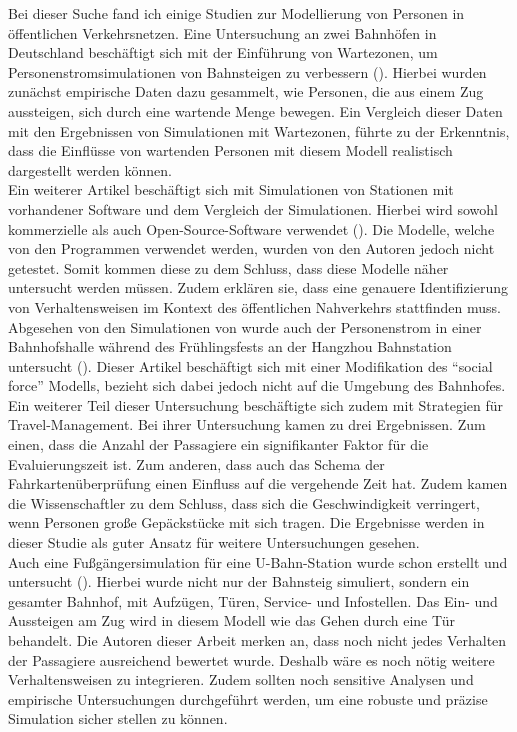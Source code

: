 Bei dieser Suche fand ich einige Studien zur Modellierung von Personen in öffentlichen Verkehrsnetzen.
Eine Untersuchung an zwei Bahnhöfen in Deutschland beschäftigt sich mit der Einführung von Wartezonen, um Personenstromsimulationen von Bahnsteigen zu verbessern (\cite{Davidich.2013}). Hierbei wurden zunächst empirische Daten dazu gesammelt, wie Personen, die aus einem Zug aussteigen, sich durch eine wartende Menge bewegen. Ein Vergleich dieser Daten mit den Ergebnissen von Simulationen mit Wartezonen, führte zu der Erkenntnis, dass die Einflüsse von wartenden Personen mit diesem Modell realistisch dargestellt werden können. \\
Ein weiterer Artikel beschäftigt sich mit Simulationen von Stationen mit vorhandener Software und dem Vergleich der Simulationen. Hierbei wird sowohl kommerzielle als auch Open-Source-Software verwendet (\cite{DubrocaVoisin.2019}). Die Modelle, welche von den Programmen verwendet werden, wurden von den Autoren jedoch nicht getestet. Somit kommen diese zu dem Schluss, dass diese Modelle näher untersucht werden müssen. Zudem erklären sie, dass eine genauere Identifizierung von Verhaltensweisen im Kontext des öffentlichen Nahverkehrs stattfinden muss.\\
Abgesehen von den Simulationen von \cite{DubrocaVoisin.2019} wurde auch der Personenstrom in einer Bahnhofshalle während des Frühlingsfests an der Hangzhou Bahnstation untersucht (\cite{Wang.2013}). Dieser Artikel beschäftigt sich mit einer Modifikation des "`social force"' Modells, bezieht sich dabei jedoch nicht auf die Umgebung des Bahnhofes. Ein weiterer Teil dieser Untersuchung beschäftigte sich zudem mit Strategien für Travel-Management. Bei ihrer Untersuchung kamen \cite{Wang.2013} zu drei Ergebnissen. Zum einen, dass die Anzahl der Passagiere ein signifikanter Faktor für die Evaluierungszeit ist. Zum anderen, dass auch das Schema der Fahrkartenüberprüfung einen Einfluss auf die vergehende Zeit hat. Zudem kamen die Wissenschaftler zu dem Schluss, dass sich die Geschwindigkeit verringert, wenn Personen große Gepäckstücke mit sich tragen. Die Ergebnisse werden in dieser Studie als guter Ansatz für weitere Untersuchungen gesehen. \\
Auch eine Fußgängersimulation für eine U-Bahn-Station wurde schon erstellt und untersucht (\cite{Chen.2017}). Hierbei wurde nicht nur der Bahnsteig simuliert, sondern ein gesamter Bahnhof, mit Aufzügen, Türen, Service- und Infostellen. Das Ein- und Aussteigen am Zug wird in diesem Modell wie das Gehen durch eine Tür behandelt. Die Autoren dieser Arbeit merken an, dass noch nicht jedes Verhalten der Passagiere ausreichend bewertet wurde. Deshalb wäre es noch nötig weitere Verhaltensweisen zu integrieren. Zudem sollten noch sensitive Analysen und empirische Untersuchungen durchgeführt werden, um eine robuste und präzise Simulation sicher stellen zu können. \\
